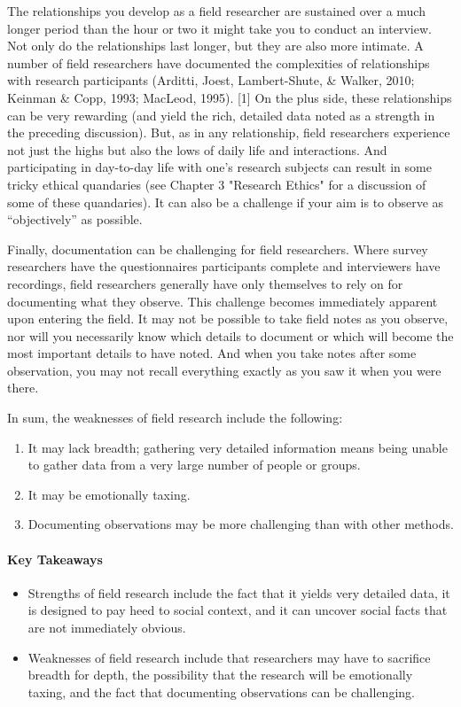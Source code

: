 The relationships you develop as a field researcher are sustained over a much longer period than the hour or two it might take you to conduct an interview. Not only do the relationships last longer, but they are also more intimate. A number of field researchers have documented the complexities of relationships with research participants (Arditti, Joest, Lambert-Shute, \& Walker, 2010; Keinman \& Copp, 1993; MacLeod, 1995). [1] On the plus side, these relationships can be very rewarding (and yield the rich, detailed data noted as a strength in the preceding discussion). But, as in any relationship, field researchers experience not just the highs but also the lows of daily life and interactions. And participating in day-to-day life with one’s research subjects can result in some tricky ethical quandaries (see Chapter 3 "Research Ethics" for a discussion of some of these quandaries). It can also be a challenge if your aim is to observe as “objectively” as possible.

Finally, documentation can be challenging for field researchers. Where survey researchers have the questionnaires participants complete and interviewers have recordings, field researchers generally have only themselves to rely on for documenting what they observe. This challenge becomes immediately apparent upon entering the field. It may not be possible to take field notes as you observe, nor will you necessarily know which details to document or which will become the most important details to have noted. And when you take notes after some observation, you may not recall everything exactly as you saw it when you were there.

In sum, the weaknesses of field research include the following:

\begin{enumerate}
	\item It may lack breadth; gathering very detailed information means being unable to gather data from a very large number of people or groups.
  \item It may be emotionally taxing.
	\item Documenting observations may be more challenging than with other methods.
\end{enumerate}

\paragraph{Key Takeaways}

\begin{itemize}
	\setlength{\itemsep}{0pt}
	\setlength{\parskip}{0pt}
	\setlength{\parsep}{0pt}
	
	\item Strengths of field research include the fact that it yields very detailed data, it is designed to pay heed to social context, and it can uncover social facts that are not immediately obvious.
	\item Weaknesses of field research include that researchers may have to sacrifice breadth for depth, the possibility that the research will be emotionally taxing, and the fact that documenting observations can be challenging.
	
\end{itemize}


